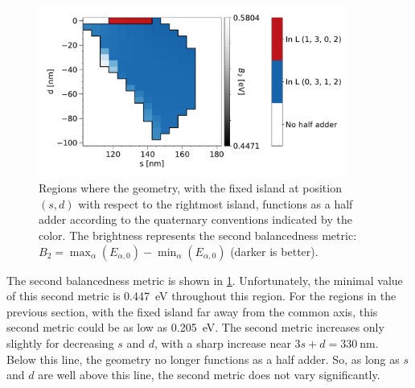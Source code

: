 \documentclass[11pt,a4paper,english]{article}
\begin{document}
\begin{figure}
    \centering
    \includegraphics[width=0.9\textwidth]{Figures/half_adder/sweep/000006_d-s/tableside(d0-100_5,s100-180_5)_balanced2.pdf}
    \caption{Regions where the geometry, with the fixed island at position $(s, d)$ with respect to the rightmost island, functions as a half adder according to the quaternary conventions indicated by the color. The brightness represents the second balancedness metric: $B_2 = \max_\alpha(E_{\alpha,0}) - \min_\alpha(E_{\alpha,0})$ (darker is better).} 
    \label{fig:HalfAdder_000006_sweepnew_d-s_balanced2}
\end{figure}
The second balancedness metric is shown in \cref{fig:HalfAdder_000006_sweepnew_d-s_balanced2}. Unfortunately, the minimal value of this second metric is \SI{0.447}{\electronvolt} throughout this region. For the regions in the previous section, with the fixed island far away from the common axis, this second metric could be as low as \SI{0.205}{\electronvolt}. The second metric increases only slightly for decreasing $s$ and $d$, with a sharp increase near $3s+d=\SI{330}{\nano\metre}$. Below this line, the geometry no longer functions as a half adder. So, as long as $s$ and $d$ are well above this line, the second metric does not vary significantly. \par
\end{document}
